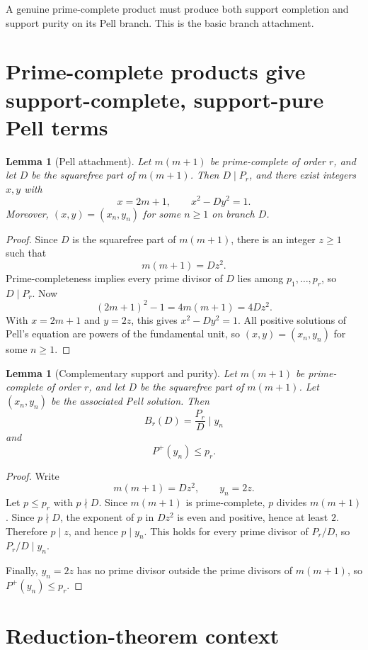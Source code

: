 \documentclass[11pt]{article}
\newtheorem{lemma}[theorem]{Lemma}
\theoremstyle{definition}
\newcommand{\Pplus}{P^{+}}
\begin{document}
A genuine prime-complete product must produce both support completion and support
purity on its Pell branch.  This is the basic branch attachment.

\section{Prime-complete products give support-complete, support-pure Pell terms}

\begin{lemma}[Pell attachment]\label{lem:pell-attach}
Let $m(m+1)$ be prime-complete of order $r$, and let $D$ be the squarefree part
of $m(m+1)$.  Then $D\mid P_r$, and there exist integers $x,y$ with
\[
  x=2m+1,
  \qquad
  x^2-Dy^2=1.
\]
Moreover, $(x,y)=(x_n,y_n)$ for some $n\ge1$ on branch $D$.
\end{lemma}

\begin{proof}
Since $D$ is the squarefree part of $m(m+1)$, there is an integer $z\ge1$ such
that
\[
  m(m+1)=Dz^2.
\]
Prime-completeness implies every prime divisor of $D$ lies among
$p_1,\ldots,p_r$, so $D\mid P_r$.  Now
\[
  (2m+1)^2-1=4m(m+1)=4Dz^2.
\]
With $x=2m+1$ and $y=2z$, this gives $x^2-Dy^2=1$.  All positive solutions of
Pell's equation are powers of the fundamental unit, so $(x,y)=(x_n,y_n)$ for
some $n\ge1$.
\end{proof}

\begin{lemma}[Complementary support and purity]\label{lem:support}
Let $m(m+1)$ be prime-complete of order $r$, and let $D$ be the squarefree part
of $m(m+1)$.  Let $(x_n,y_n)$ be the associated Pell solution.  Then
\[
  B_r(D)=\frac{P_r}{D}\mid y_n
\]
and
\[
  \Pplus(y_n)\le p_r.
\]
\end{lemma}

\begin{proof}
Write
\[
  m(m+1)=Dz^2,
  \qquad
  y_n=2z.
\]
Let $p\le p_r$ with $p\nmid D$.  Since $m(m+1)$ is prime-complete, $p$ divides
$m(m+1)$.  Since $p\nmid D$, the exponent of $p$ in $Dz^2$ is even and positive,
hence at least $2$.  Therefore $p\mid z$, and hence $p\mid y_n$.  This holds for
every prime divisor of $P_r/D$, so $P_r/D\mid y_n$.

Finally, $y_n=2z$ has no prime divisor outside the prime divisors of $m(m+1)$,
so $\Pplus(y_n)\le p_r$.
\end{proof}

\section{Reduction-theorem context}
\end{document}
